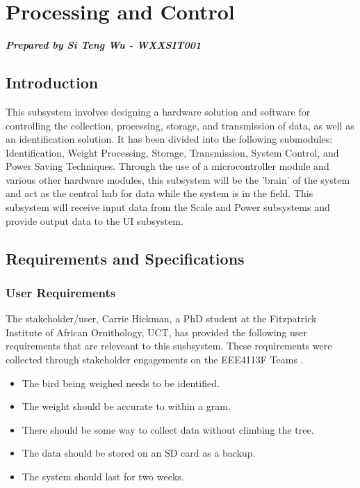 \documentclass[class=report,11pt,crop=false]{standalone}
\begin{document}
\chapter{Processing and Control}

\textbf{\textit{Prepared by Si Teng Wu - WXXSIT001}}
\vspace{0.5cm}
\section{Introduction}
This subsystem involves designing a hardware solution and software for controlling the collection, processing, storage, and transmission of data, as well as an identification solution. It has been divided into the following submodules: Identification, Weight Processing, Storage, Transmission, System Control, and Power Saving Techniques. Through the use of a microcontroller module and various other hardware modules, this subsystem will be the 'brain' of the system and act as the central hub for data while the system is in the field. This subsystem will receive input data from the Scale and Power subsystems and provide output data to the UI subsystem.

\section{Requirements and Specifications}
\subsection*{User Requirements}
The stakeholder/user, Carrie Hickman, a PhD student at the Fitzpatrick Institute of African Ornithology, UCT, has provided the following user requirements that are releveant to this susbsystem. These requirements were collected through stakeholder engagements on the EEE4113F Teams \cite{stakeholder}.
\begin{itemize}
    \item The bird being weighed needs to be identified.
    \item The weight should be accurate to within a gram.
    \item There should be some way to collect data without climbing the tree.
    \item The data should be stored on an SD card as a backup.
    \item The system should last for two weeks.
\end{itemize}
\end{document}
